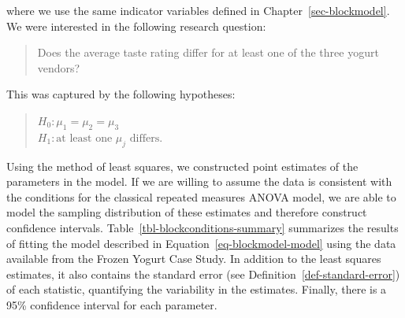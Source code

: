 \documentclass[
  letterpaper,
  DIV=11,
  numbers=noendperiod]{scrreprt}
\theoremstyle{plain}
\theoremstyle{definition}
\theoremstyle{definition}
\theoremstyle{remark}
\begin{document}
where we use the same indicator variables defined in
Chapter~\ref{sec-blockmodel}. We were interested in the following
research question:

\begin{quote}
Does the average taste rating differ for at least one of the three
yogurt vendors?
\end{quote}

This was captured by the following hypotheses:

\begin{quote}
\(H_0: \mu_1 = \mu_2 = \mu_3\)\\
\(H_1: \text{at least one } \mu_j \text{ differs}.\)
\end{quote}

Using the method of least squares, we constructed point estimates of the
parameters in the model. If we are willing to assume the data is
consistent with the conditions for the classical repeated measures ANOVA
model, we are able to model the sampling distribution of these estimates
and therefore construct confidence intervals.
Table~\ref{tbl-blockconditions-summary} summarizes the results of
fitting the model described in Equation~\ref{eq-blockmodel-model} using
the data available from the Frozen Yogurt Case Study. In addition to the
least squares estimates, it also contains the standard error (see
Definition~\ref{def-standard-error}) of each statistic, quantifying the
variability in the estimates. Finally, there is a 95\% confidence
interval for each parameter.
\end{document}

